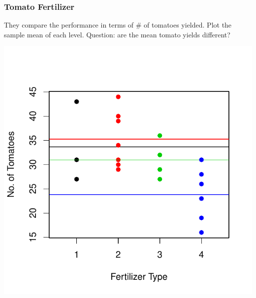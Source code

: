 \documentclass[handout]{beamer}
\newcommand{\blue}[1]{\textcolor{blue2}{#1}}
\begin{document}
\addtocounter{framenumber}{-1}
\begin{frame}
\frametitle{Tomato Fertilizer}
They compare the performance in terms of \# of tomatoes yielded. Plot the sample mean of each level. \blue{Question:  are the mean tomato yields different?}
\begin{center}
\includegraphics{figure/lec22-004}
\end{center}
\end{frame}
\end{document}
